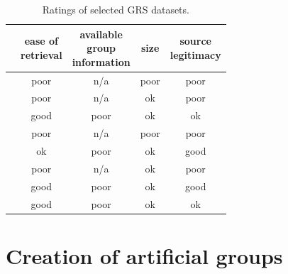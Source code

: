 \begin{table}[!ht]
    \centering
    \begin{tabular}{ r | c c c c}
         & \makecell[c]{ease of \\ retrieval} & \makecell[c]{available \\ group \\ information} & size & \makecell[c]{source \\ legitimacy}\\
        \hline
            \nameref{subsubsec:04_group_datasets.overview.camra}
                & poor & n/a & poor & poor\\
            \nameref{subsubsec:04_group_datasets.overview.douban}
                & poor & n/a & ok & poor \\
            \nameref{subsubsec:04_group_datasets.overview.gowalla}
                & good & poor & ok &  ok\\
            \nameref{subsubsec:04_group_datasets.overview.mafengwo}
                & poor & n/a & poor & poor\\
            \nameref{subsubsec:04_group_datasets.overview.meetup}
                & ok & poor & ok & good\\
            \nameref{subsubsec:04_group_datasets.overview.plancast}
                & poor & n/a & ok & poor\\
            \nameref{subsubsec:04_group_datasets.overview.yelp}
                & good & poor & ok & good\\
            \nameref{subsubsec:04_group_datasets.overview.weeplaces}
                &  good & poor & ok & ok\\
    \end{tabular}
    \caption{Ratings of selected GRS datasets.}
    \label{table:5.2_GRS_datasets_rating}
\end{table}





\section{Creation of artificial groups} \label{sec:creation_of_artificial_groups}


